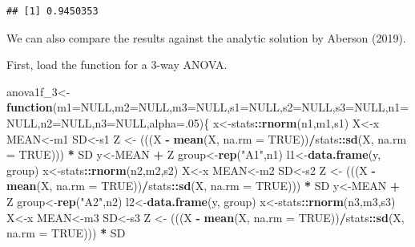\documentclass[]{article}
\newenvironment{Shaded}{\begin{snugshade}}{\end{snugshade}}
\newcommand{\KeywordTok}[1]{\textcolor[rgb]{0.13,0.29,0.53}{\textbf{#1}}}
\newcommand{\DataTypeTok}[1]{\textcolor[rgb]{0.13,0.29,0.53}{#1}}
\newcommand{\DecValTok}[1]{\textcolor[rgb]{0.00,0.00,0.81}{#1}}
\newcommand{\StringTok}[1]{\textcolor[rgb]{0.31,0.60,0.02}{#1}}
\newcommand{\OtherTok}[1]{\textcolor[rgb]{0.56,0.35,0.01}{#1}}
\newcommand{\ControlFlowTok}[1]{\textcolor[rgb]{0.13,0.29,0.53}{\textbf{#1}}}
\newcommand{\OperatorTok}[1]{\textcolor[rgb]{0.81,0.36,0.00}{\textbf{#1}}}
\newcommand{\NormalTok}[1]{#1}
\begin{document}
\begin{verbatim}
## [1] 0.9450353
\end{verbatim}

We can also compare the results against the analytic solution by Aberson
(2019).

First, load the function for a 3-way ANOVA.

\begin{Shaded}
\begin{Highlighting}[]
\NormalTok{anova1f_}\DecValTok{3}\NormalTok{<-}\ControlFlowTok{function}\NormalTok{(}\DataTypeTok{m1=}\OtherTok{NULL}\NormalTok{,}\DataTypeTok{m2=}\OtherTok{NULL}\NormalTok{,}\DataTypeTok{m3=}\OtherTok{NULL}\NormalTok{,}\DataTypeTok{s1=}\OtherTok{NULL}\NormalTok{,}\DataTypeTok{s2=}\OtherTok{NULL}\NormalTok{,}\DataTypeTok{s3=}\OtherTok{NULL}\NormalTok{,}\DataTypeTok{n1=}\OtherTok{NULL}\NormalTok{,}\DataTypeTok{n2=}\OtherTok{NULL}\NormalTok{,}\DataTypeTok{n3=}\OtherTok{NULL}\NormalTok{,}\DataTypeTok{alpha=}\NormalTok{.}\DecValTok{05}\NormalTok{)\{}
\NormalTok{x<-stats}\OperatorTok{::}\KeywordTok{rnorm}\NormalTok{(n1,m1,s1)}
\NormalTok{X<-x}
\NormalTok{MEAN<-m1}
\NormalTok{SD<-s1}
\NormalTok{Z <-}\StringTok{ }\NormalTok{(((X }\OperatorTok{-}\StringTok{ }\KeywordTok{mean}\NormalTok{(X, }\DataTypeTok{na.rm =} \OtherTok{TRUE}\NormalTok{))}\OperatorTok{/}\NormalTok{stats}\OperatorTok{::}\KeywordTok{sd}\NormalTok{(X, }\DataTypeTok{na.rm =} \OtherTok{TRUE}\NormalTok{))) }\OperatorTok{*}\StringTok{ }\NormalTok{SD}
\NormalTok{y<-MEAN }\OperatorTok{+}\StringTok{ }\NormalTok{Z}
\NormalTok{group<-}\KeywordTok{rep}\NormalTok{(}\StringTok{"A1"}\NormalTok{,n1)}
\NormalTok{l1<-}\KeywordTok{data.frame}\NormalTok{(y, group)}
\NormalTok{x<-stats}\OperatorTok{::}\KeywordTok{rnorm}\NormalTok{(n2,m2,s2)}
\NormalTok{X<-x}
\NormalTok{MEAN<-m2}
\NormalTok{SD<-s2}
\NormalTok{Z <-}\StringTok{ }\NormalTok{(((X }\OperatorTok{-}\StringTok{ }\KeywordTok{mean}\NormalTok{(X, }\DataTypeTok{na.rm =} \OtherTok{TRUE}\NormalTok{))}\OperatorTok{/}\NormalTok{stats}\OperatorTok{::}\KeywordTok{sd}\NormalTok{(X, }\DataTypeTok{na.rm =} \OtherTok{TRUE}\NormalTok{))) }\OperatorTok{*}\StringTok{ }\NormalTok{SD}
\NormalTok{y<-MEAN }\OperatorTok{+}\StringTok{ }\NormalTok{Z}
\NormalTok{group<-}\KeywordTok{rep}\NormalTok{(}\StringTok{"A2"}\NormalTok{,n2)}
\NormalTok{l2<-}\KeywordTok{data.frame}\NormalTok{(y, group)}
\NormalTok{x<-stats}\OperatorTok{::}\KeywordTok{rnorm}\NormalTok{(n3,m3,s3)}
\NormalTok{X<-x}
\NormalTok{MEAN<-m3}
\NormalTok{SD<-s3}
\NormalTok{Z <-}\StringTok{ }\NormalTok{(((X }\OperatorTok{-}\StringTok{ }\KeywordTok{mean}\NormalTok{(X, }\DataTypeTok{na.rm =} \OtherTok{TRUE}\NormalTok{))}\OperatorTok{/}\NormalTok{stats}\OperatorTok{::}\KeywordTok{sd}\NormalTok{(X, }\DataTypeTok{na.rm =} \OtherTok{TRUE}\NormalTok{))) }\OperatorTok{*}\StringTok{ }\NormalTok{SD}

\end{Highlighting}
\end{Shaded}
\end{document}

